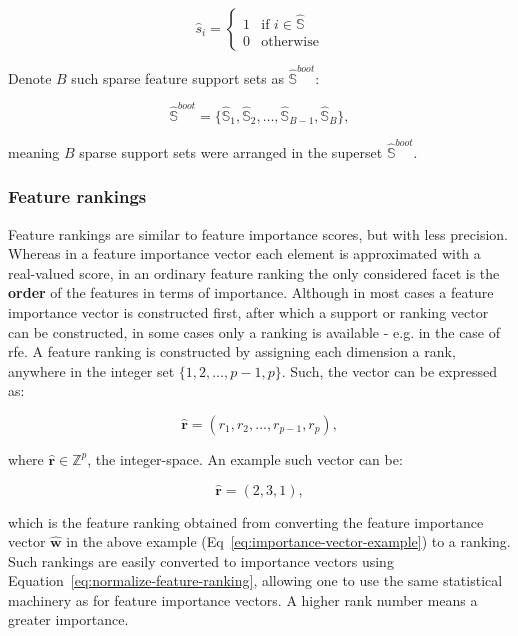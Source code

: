 \documentclass[../main.tex]{subfiles}
\begin{document}
\begin{equation}
\hat{s}_i = \begin{cases}
  1 & \text{if } i \in \hat{\mathbb{S}}\\
  0 & \text{otherwise}
\end{cases}
\end{equation}

Denote $B$ such sparse feature support sets as $\hat{\mathbb{S}}^{boot}$:

\begin{equation}\label{eq:feature-support-superset}
\hat{\mathbb{S}}^{boot} = \{ \hat{\mathbb{S}}_1, \hat{\mathbb{S}}_2, \ldots, \hat{\mathbb{S}}_{B-1}, \hat{\mathbb{S}}_B \},
\end{equation}

meaning $B$ sparse support sets were arranged in the superset $\hat{\mathbb{S}}^{boot}$.



\subsubsection{Feature rankings}\label{section:feature-rankings-definition}
Feature rankings are similar to feature importance scores, but with less precision. Whereas in a feature importance vector each element is approximated with a real-valued score, in an ordinary feature ranking the only considered facet is the \textbf{order} of the features in terms of importance. Although in most cases a feature importance vector is constructed first, after which a support or ranking vector can be constructed, in some cases only a ranking is available - e.g. in the case of \gls{rfe}. A feature ranking is constructed by assigning each dimension a rank, anywhere in the integer set $\{1, 2, \ldots, p - 1, p\}$. Such, the vector can be expressed as:

\begin{equation}
\hat{\boldsymbol{r}} = (r_1, r_2, \ldots, r_{p-1}, r_p),
\end{equation}

where $\hat{\boldsymbol{r}} \in \mathbb{Z}^p$, the integer-space. An example such vector can be:

\begin{equation}\hat{\boldsymbol{r}} = (2, 3, 1),\end{equation}

which is the feature ranking obtained from converting the feature importance vector $\hat{\boldsymbol{w}}$ in the above example (Eq~\ref{eq:importance-vector-example}) to a ranking. Such rankings are easily converted to importance vectors using Equation~\ref{eq:normalize-feature-ranking}, allowing one to use the same statistical machinery as for feature importance vectors. A higher rank number means a greater importance.
\end{document}
